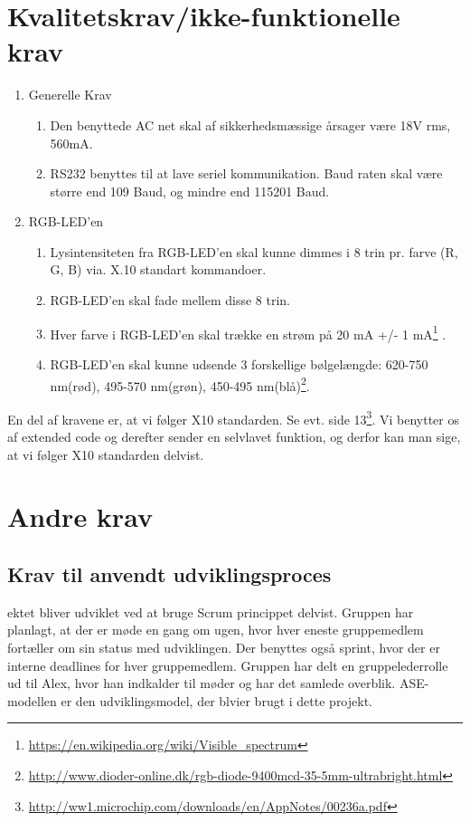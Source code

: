 \documentclass[oneside]{memoir}
\begin{document}
\section{Kvalitetskrav/ikke-funktionelle krav}
\begin{enumerate}
\item Generelle Krav
    \begin{enumerate}[label*=\arabic*.]
    \item Den benyttede AC net skal af sikkerhedsmæssige årsager være 18V rms, 560mA.
    \item RS232 benyttes til at lave seriel kommunikation. Baud raten skal være større end 109 Baud, og
mindre end 115201 Baud.
    \end{enumerate}
\item RGB-LED'en
    \begin{enumerate}[label*=\arabic*.]
    \item Lysintensiteten fra RGB-LED’en skal kunne dimmes i 8 trin pr. farve (R, G, B) via. X.10 standart
kommandoer.
    \item RGB-LED’en skal fade mellem disse 8 trin.
    \item Hver farve i RGB-LED’en skal trække en strøm på 20 mA +/- 1 mA\footnote{\url{https://en.wikipedia.org/wiki/Visible_spectrum}} .
    \item RGB-LED’en skal kunne udsende 3 forskellige bølgelængde: 620-750 nm(rød), 495-570 nm(grøn),
450-495 nm(blå)\footnote{\url{http://www.dioder-online.dk/rgb-diode-9400mcd-35-5mm-ultrabright.html}}.
    \end{enumerate}
\end{enumerate}

En del af kravene er, at vi følger X10 standarden. Se evt. side 13\footnote{\url{http://ww1.microchip.com/downloads/en/AppNotes/00236a.pdf}}. Vi benytter os af extended code og
derefter sender en selvlavet funktion, og derfor kan man sige, at vi følger X10 standarden delvist.


\section{Andre krav}
\subsection{Krav til anvendt udviklingsproces}
ektet bliver udviklet ved at bruge Scrum princippet delvist. Gruppen har planlagt, at der er møde en gang
om ugen, hvor hver eneste gruppemedlem fortæller om sin status med udviklingen. Der benyttes også sprint,
hvor der er interne deadlines for hver gruppemedlem. Gruppen har delt en gruppelederrolle ud til Alex, hvor
han indkalder til møder og har det samlede overblik. ASE-modellen er den udviklingsmodel, der blvier brugt i dette projekt.
\end{document}
